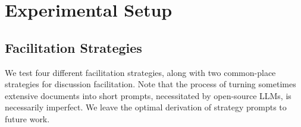 \section{Experimental Setup}
\label{sec:experimental}

\subsection{Facilitation Strategies}
\label{ssec:experimental:strategies}

We test four different facilitation strategies, along with two common-place strategies for discussion facilitation. Note that the process of turning sometimes extensive documents into short prompts, necessitated by open-source LLMs, is necessarily imperfect. We leave the optimal derivation of strategy prompts to future work.

